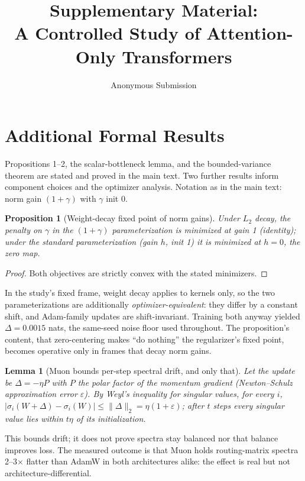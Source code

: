 \documentclass[letterpaper]{article} %
\title{Supplementary Material:\\A Controlled Study of Attention-Only Transformers}
\author{
    Anonymous Submission
}
\newtheorem{proposition}{Proposition}
\newtheorem{lemma}{Lemma}
\begin{document}
\maketitle

\section{Additional Formal Results}

Propositions 1--2, the scalar-bottleneck lemma, and the bounded-variance
theorem are stated and proved in the main text. Two further results
inform component choices and the optimizer analysis. Notation as in the
main text: norm gain $(1+\gamma)$ with $\gamma$ init 0.

\begin{proposition}[Weight-decay fixed point of norm gains]
Under $L_2$ decay, the penalty on $\gamma$ in the $(1+\gamma)$
parameterization is minimized at gain 1 (identity); under the standard
parameterization (gain $h$, init 1) it is minimized at $h=0$, the zero
map.
\end{proposition}
\begin{proof}
Both objectives are strictly convex with the stated minimizers.
\end{proof}
In the study's fixed frame, weight decay applies to kernels only, so the
two parameterizations are additionally \emph{optimizer-equivalent}: they
differ by a constant shift, and Adam-family updates are shift-invariant.
Training both anyway yielded $\Delta = 0.0015$ nats, the same-seed noise
floor used throughout. The proposition's content, that zero-centering
makes ``do nothing'' the regularizer's fixed point, becomes operative
only in frames that decay norm gains.

\begin{lemma}[Muon bounds per-step spectral drift, and only that]
Let the update be $\Delta = -\eta P$ with $P$ the polar factor of the
momentum gradient (Newton--Schulz approximation error $\varepsilon$). By
Weyl's inequality for singular values, for every $i$,
$|\sigma_i(W+\Delta)-\sigma_i(W)| \le \|\Delta\|_2 = \eta(1+\varepsilon)$;
after $t$ steps every singular value lies within $t\eta$ of its
initialization.
\end{lemma}
This bounds drift; it does not prove spectra stay balanced nor that
balance improves loss. The measured outcome is that Muon holds
routing-matrix spectra 2--3$\times$ flatter than AdamW in both
architectures alike: the effect is real but not architecture-differential.
\end{document}
